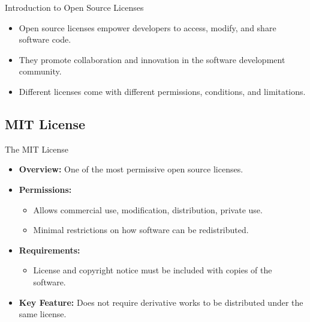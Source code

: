 \documentclass[10pt]{beamer}
\begin{document}
    \begin{frame}{Introduction to Open Source Licenses}
      \begin{itemize}
          \item Open source licenses empower developers to access, modify, and share software code.
          \item They promote collaboration and innovation in the software development community.
          \item Different licenses come with different permissions, conditions, and limitations.
      \end{itemize}
  \end{frame}
  \subsection{MIT License}
  \begin{frame}{The MIT License}
    \begin{itemize}
        \item \textbf{Overview:} One of the most permissive open source licenses.
        \item \textbf{Permissions:} 
            \begin{itemize}
                \item Allows commercial use, modification, distribution, private use.
                \item Minimal restrictions on how software can be redistributed.
            \end{itemize}
        \item \textbf{Requirements:}
            \begin{itemize}
                \item License and copyright notice must be included with copies of the software.
            \end{itemize}
        \item \textbf{Key Feature:} Does not require derivative works to be distributed under the same license.
    \end{itemize}
\end{frame}
\end{document}
